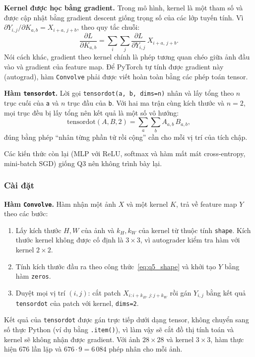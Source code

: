 \textbf{Kernel được học bằng gradient.} Trong mô hình, kernel là một tham số
và được cập nhật bằng gradient descent giống trọng số của các lớp tuyến
tính. Vì $\partial Y_{i,j} / \partial K_{a,b} = X_{i+a,\, j+b}$, theo quy tắc
chuỗi:
\begin{equation}
\frac{\partial L}{\partial K_{a,b}} = \sum_{i} \sum_{j}
\frac{\partial L}{\partial Y_{i,j}}\, X_{i+a,\, j+b}.
\end{equation}
Nói cách khác, gradient theo kernel chính là phép tương quan chéo giữa ảnh
đầu vào và gradient của feature map. Để PyTorch tự tính được gradient này
(autograd), hàm \texttt{Convolve} phải được viết hoàn toàn bằng các phép
toán tensor.

\textbf{Hàm \texttt{tensordot}.} Lời gọi \texttt{tensordot(a, b, dims=n)}
nhân và lấy tổng theo $n$ trục cuối của \texttt{a} và $n$ trục đầu của
\texttt{b}. Với hai ma trận cùng kích thước và $n = 2$, mọi trục đều bị lấy
tổng nên kết quả là một số vô hướng:
\begin{equation}
\mathrm{tensordot}(A, B, 2) = \sum_{a} \sum_{b} A_{a,b}\, B_{a,b},
\end{equation}
đúng bằng phép ``nhân từng phần tử rồi cộng'' cần cho mỗi vị trí của tích
chập.

Các kiến thức còn lại (MLP với ReLU, softmax và hàm mất mát cross-entropy,
mini-batch SGD) giống Q3 nên không trình bày lại.

\subsubsection{Cài đặt}

\textbf{Hàm \texttt{Convolve}.} Hàm nhận một ảnh $X$ và một kernel $K$, trả
về feature map $Y$ theo các bước:
\begin{enumerate}
  \item Lấy kích thước $H, W$ của ảnh và $k_H, k_W$ của kernel từ thuộc tính
  \texttt{shape}. Kích thước kernel không được cố định là $3 \times 3$, vì
  autograder kiểm tra hàm với kernel $2 \times 2$.
  \item Tính kích thước đầu ra theo công thức~\eqref{eq:q5_shape} và khởi tạo $Y$ bằng hàm
  \texttt{zeros}.
  \item Duyệt mọi vị trí $(i, j)$: cắt patch
  $X_{i:i+k_H,\, j:j+k_W}$ rồi gán $Y_{i,j}$ bằng kết quả
  \texttt{tensordot} của patch với kernel, \texttt{dims=2}.
\end{enumerate}
Kết quả của \texttt{tensordot} được gán trực tiếp dưới dạng tensor, không
chuyển sang số thực Python (ví dụ bằng \texttt{.item()}), vì làm vậy sẽ cắt
đồ thị tính toán và kernel sẽ không nhận được gradient. Với ảnh
$28 \times 28$ và kernel $3 \times 3$, hàm thực hiện 676 lần lặp và
$676 \cdot 9 = 6\,084$ phép nhân cho mỗi ảnh.


